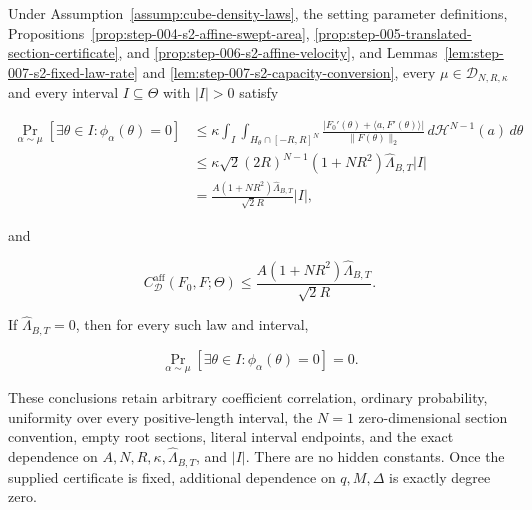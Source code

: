 \begin{proposition}
\label{prop:step-007-s2-general-affine-rate}
Under Assumption~\ref{assump:cube-density-laws}, the setting parameter definitions, Propositions~\ref{prop:step-004-s2-affine-swept-area},
\ref{prop:step-005-translated-section-certificate}, and
\ref{prop:step-006-s2-affine-velocity}, and
Lemmas~\ref{lem:step-007-s2-fixed-law-rate} and
\ref{lem:step-007-s2-capacity-conversion}, every
\(\mu\in\mathcal D_{N,R,\kappa}\) and every interval
\(I\subseteq\Theta\) with \(\lvert I\rvert>0\) satisfy

\begin{equation}
\begin{aligned}
\Pr_{\alpha\sim\mu}[\exists\theta\in I:\phi_\alpha(\theta)=0]
&\leq
\kappa\int_I\int_{H_\theta\cap[-R,R]^N}
\frac{\lvert F_0'(\theta)+\langle a,F'(\theta)\rangle\rvert}
{\lVert F(\theta)\rVert_2}
\,d\mathcal H^{N-1}(a)\,d\theta\\
&\leq
\kappa\sqrt2(2R)^{N-1}(1+NR^2)
\widehat\Lambda_{B,T}\lvert I\rvert\\
&=
\frac{A(1+NR^2)\widehat\Lambda_{B,T}}{\sqrt2R}
\lvert I\rvert,
\end{aligned}
\label{eq:step-007-final-rate}
\end{equation}

and

\begin{equation}
C^{\mathrm{aff}}_{\mathcal D}(F_0,F;\Theta)
\leq
\frac{A(1+NR^2)\widehat\Lambda_{B,T}}{\sqrt2R}.
\label{eq:step-007-final-capacity}
\end{equation}

If \(\widehat\Lambda_{B,T}=0\), then for every such law and interval,

\begin{equation}
\Pr_{\alpha\sim\mu}[\exists\theta\in I:\phi_\alpha(\theta)=0]=0.
\label{eq:step-007-zero-probability}
\end{equation}

These conclusions retain arbitrary coefficient correlation, ordinary probability, uniformity over every
positive-length interval, the \(N=1\) zero-dimensional section convention, empty root sections, literal
interval endpoints, and the exact dependence on \(A,N,R,\kappa,\widehat\Lambda_{B,T}\), and
\(\lvert I\rvert\). There are no hidden constants. Once the supplied certificate is fixed, additional
dependence on \(q,M,\Delta\) is exactly degree zero.


\end{proposition}

